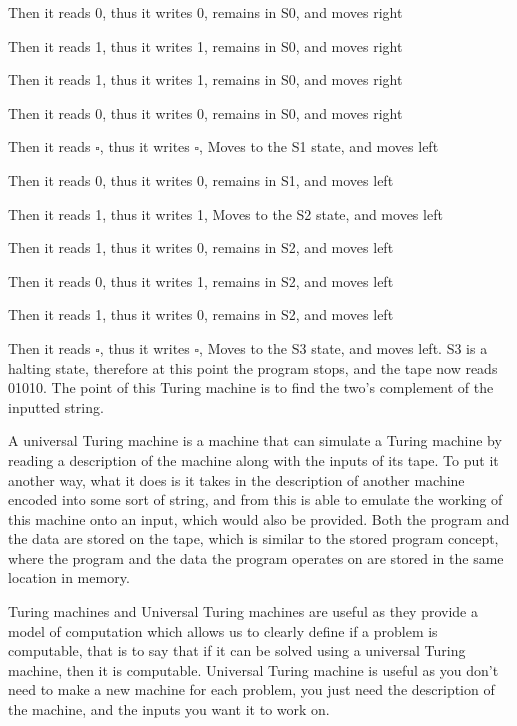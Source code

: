   Then it reads 0, thus it writes 0, remains in S0, and moves right
  
  
  
  Then it reads 1, thus it writes 1, remains in S0, and moves right
  
  
  
  Then it reads 1, thus it writes 1, remains in S0, and moves right
  
  
  
  Then it reads 0, thus it writes 0, remains in S0, and moves right
  
  
  
  Then it reads $\square$, thus it writes $\square$, Moves to the S1 state, and moves left
  
  
  
  Then it reads 0, thus it writes 0, remains in S1, and moves left
  
  
  
  Then it reads 1, thus it writes 1, Moves to the S2 state, and moves left
  
  
  
  Then it reads 1, thus it writes 0, remains in S2, and moves left
  
  
  
  Then it reads 0, thus it writes 1, remains in S2, and moves left
  
  
  
  Then it reads 1, thus it writes 0, remains in S2, and moves left
  
  
  
  Then it reads $\square$, thus it writes $\square$, Moves to the S3 state, and moves left. S3 is a halting state, therefore at this point the program stops, and the tape now reads 01010. The point of this Turing machine is to find the two's complement of the inputted string.
  
  A universal Turing machine is a machine that can simulate a Turing machine by reading a description of the machine along with the inputs of its tape. To put it another way, what it does is it takes in the description of another machine encoded into some sort of string, and from this is able to emulate the working of this machine onto an input, which would also be provided. Both the program and the data are stored on the tape, which is similar to the stored program concept, where the program and the data the program operates on are stored in the same location in memory. 
  
  Turing machines and Universal Turing machines are useful as they provide a model of computation which allows us to clearly define if a problem is computable, that is to say that if it can be solved using a universal Turing machine, then it is computable. Universal Turing machine is useful as you don't need to make a new machine for each problem, you just need the description of the machine, and the inputs you want it to work on.